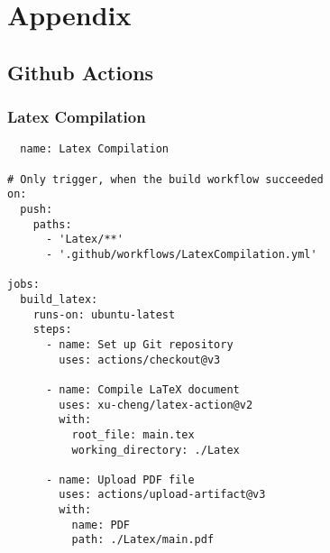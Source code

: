 \chapter*{Appendix}






\section*{Github Actions}
\subsection*{Latex Compilation}
\begin{lstlisting}
  name: Latex Compilation

# Only trigger, when the build workflow succeeded
on:
  push:
    paths:
      - 'Latex/**'
      - '.github/workflows/LatexCompilation.yml'

jobs:
  build_latex:
    runs-on: ubuntu-latest
    steps:
      - name: Set up Git repository
        uses: actions/checkout@v3
        
      - name: Compile LaTeX document
        uses: xu-cheng/latex-action@v2
        with:
          root_file: main.tex
          working_directory: ./Latex
          
      - name: Upload PDF file
        uses: actions/upload-artifact@v3
        with:
          name: PDF
          path: ./Latex/main.pdf
\end{lstlisting}

